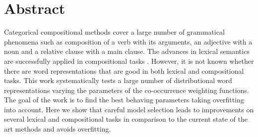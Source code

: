 \chapter*{Abstract}
\label{cha:abstract}

Categorical compositional methods \cite{DBLP:journals/corr/abs-1003-4394} cover a large number of grammatical phenomena such as composition of a verb with its arguments, an adjective with a noun and a relative clause with a main clause. The advances in lexical semantics \cite{mikolov2013efficient,baroni-dinu-kruszewski:2014:P14-1,TACL570} are successfully applied in compositional tasks \cite{milajevs-EtAl:2014:EMNLP2014}. However, it is not known whether there are word representations that are good in both lexical and compositional tasks.
%
This work systematically tests a large number of distributional word representations varying the parameters of the co-occurrence weighting functions.
The goal of the work is to find the best behaving parameters taking overfitting \cite{lapesa2014large} into account.
%
Here we show that careful model selection leads to improvements on several lexical and compositional tasks in comparison to the current state of the art methods and avoids overfitting.

